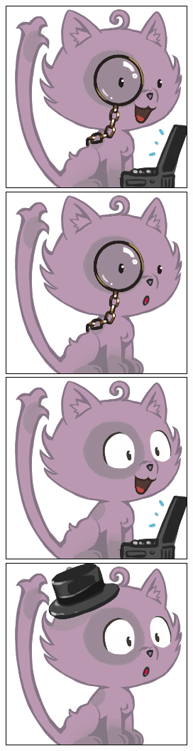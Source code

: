 \documentclass[a4paper, 12pt]{article}
\begin{document}
  \includegraphics[scale=0.45]{out/62.png}
  \includegraphics[scale=0.45]{out/29.png}
  \includegraphics[scale=0.45]{out/68.png}
  \includegraphics[scale=0.45]{out/107.png}
\end{document}
